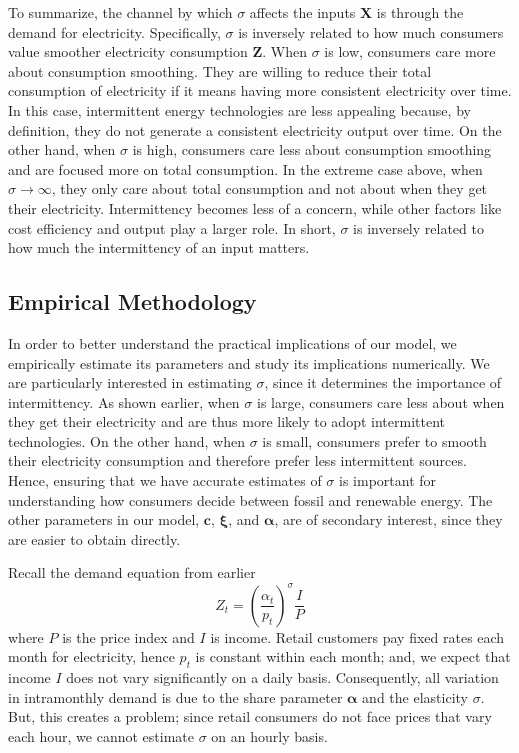 \documentclass[11pt,a4paper,leqno]{extarticle}
\begin{document}
	To summarize, the channel by which $\sigma$ affects the inputs $\mathbf{X}$ is through the demand for electricity. Specifically, $\sigma$ is inversely related to how much consumers value smoother electricity consumption $\mathbf{Z}$. When $\sigma$ is low, consumers care more about consumption smoothing. They are willing to reduce their total consumption of electricity if it means having more consistent electricity over time. In this case, intermittent energy technologies are less appealing because, by definition, they do not generate a consistent electricity output over time. On the other hand, when $\sigma$ is high, consumers care less about consumption smoothing and are focused more on total consumption. In the extreme case above, when $\sigma \to \infty$, they only care about total consumption and not about when they get their electricity. Intermittency becomes less of a concern, while other factors like cost efficiency and output play a larger role. In short, $\sigma$ is inversely related to how much the intermittency of an input matters. 
	
	
	\subsection{Empirical Methodology}
	\label{sec:methodology}
	
	In order to better understand the practical implications of our model, we empirically estimate its parameters and study its implications numerically. We are particularly interested in estimating $\sigma$, since it determines the importance of intermittency. As shown earlier, when $\sigma$ is large, consumers care less about when they get their electricity and are thus more likely to adopt intermittent technologies. On the other hand, when $\sigma$ is small, consumers prefer to smooth their electricity consumption and therefore prefer less intermittent sources. Hence, ensuring that we have accurate estimates of $\sigma$ is important for understanding how consumers decide between fossil and renewable energy. The other parameters in our model, $\mathbf{c}$,  $\boldsymbol{\xi}$, and $\boldsymbol{\alpha}$, are of secondary interest, since they are easier to obtain directly. 
	
	Recall the demand equation from earlier
	\begin{equation}
	Z_t = \left(\frac{\alpha_t}{p_t} \right)^\sigma \frac{I}{P}
	\end{equation}
	where $P$ is the price index and $I$ is income. Retail customers pay fixed rates each month for electricity, hence $p_t$ is constant within each month; and, we expect that income $I$ does not vary significantly on a daily basis. Consequently, all variation in intramonthly demand is due to the share parameter $\boldsymbol{\alpha}$ and the elasticity $\sigma$. But, this creates a problem; since retail consumers do not face prices that vary each hour, we cannot estimate  $\sigma$ on an hourly basis. 
	
\end{document}
